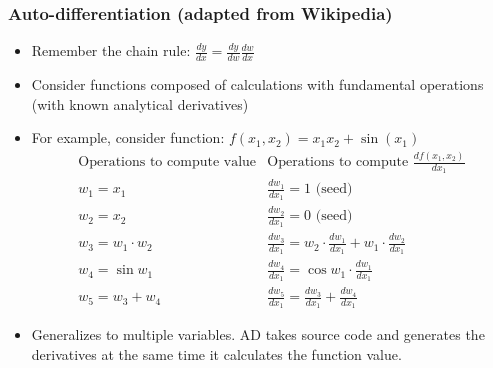 \documentclass[nofootline]{etk-presentation}
\begin{document}
\begin{frame}[fragile]	\frametitle{Auto-differentiation (adapted from Wikipedia)}
	\begin{itemize}
		\item Remember the chain rule: $\frac{dy}{dx} = \frac{dy}{dw} \frac{dw}{dx}$
		\item Consider functions composed of calculations with fundamental operations (with known analytical derivatives)
		\item For example, consider function: $f(x_1, x_2) = x_1 x_2 + \sin(x_1)$	
	$$
\begin{array}{l|l}
\text{Operations to compute value} &
\text{Operations to compute $\frac{d f(x_1,x_2)}{d x_1}$}
\\
\hline
w_1 = x_1 &
\frac{d w_1}{d x_1} = 1 \text{ (seed)}\\
w_2 = x_2 &
\frac{d  w_2}{d x_1} = 0 \text{ (seed)}
\\
w_3 = w_1 \cdot w_2 &
\frac{d  w_3}{d x_1} = w_2 \cdot \frac{d  w_1}{d x_1} + w_1 \cdot \frac{d  w_2}{d x_1}
\\
w_4 = \sin w_1 &
\frac{d  w_4}{d x_1} = \cos w_1 \cdot \frac{d  w_1}{d x_1}
\\
w_5 = w_3 + w_4 &
\frac{d  w_5}{d x_1} = \frac{d  w_3}{d x_1} + \frac{d  w_4}{d x_1}
\end{array}
$$
\item Generalizes to multiple variables.  AD takes source code and generates the derivatives at the same time it calculates the function value.%
	\end{itemize}
\end{frame}
\end{document}
